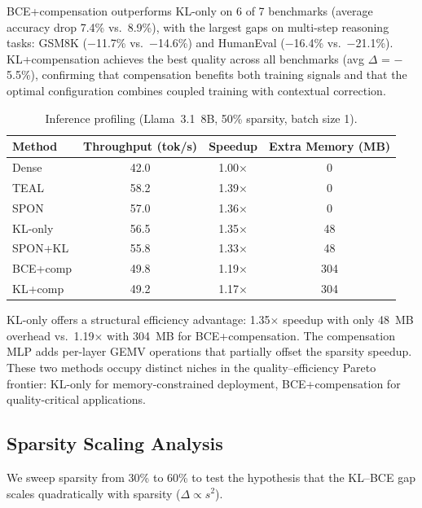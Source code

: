 \documentclass[11pt]{article}
\begin{document}
BCE+compensation outperforms KL-only on 6 of 7 benchmarks (average accuracy drop 7.4\% vs.\ 8.9\%), with the largest gaps on multi-step reasoning tasks: GSM8K ($-$11.7\% vs.\ $-$14.6\%) and HumanEval ($-$16.4\% vs.\ $-$21.1\%).
KL+compensation achieves the best quality across all benchmarks (avg $\Delta$ = $-$5.5\%), confirming that compensation benefits both training signals and that the optimal configuration combines coupled training with contextual correction.

\begin{table}[h]
\centering
\caption{Inference profiling (Llama~3.1~8B, 50\% sparsity, batch size 1).}
\label{tab:profiling}
\small
\begin{tabular}{lccc}
\toprule
Method & Throughput (tok/s) & Speedup & Extra Memory (MB) \\
\midrule
Dense & 42.0 & 1.00$\times$ & 0 \\
TEAL & 58.2 & 1.39$\times$ & 0 \\
SPON & 57.0 & 1.36$\times$ & 0 \\
KL-only & 56.5 & 1.35$\times$ & 48 \\
SPON+KL & 55.8 & 1.33$\times$ & 48 \\
BCE+comp & 49.8 & 1.19$\times$ & 304 \\
KL+comp & 49.2 & 1.17$\times$ & 304 \\
\bottomrule
\end{tabular}
\end{table}

KL-only offers a structural efficiency advantage: 1.35$\times$ speedup with only 48~MB overhead vs.\ 1.19$\times$ with 304~MB for BCE+compensation.
The compensation MLP adds per-layer GEMV operations that partially offset the sparsity speedup.
These two methods occupy distinct niches in the quality--efficiency Pareto frontier: KL-only for memory-constrained deployment, BCE+compensation for quality-critical applications.

\subsection{Sparsity Scaling Analysis}

We sweep sparsity from 30\% to 60\% to test the hypothesis that the KL--BCE gap scales quadratically with sparsity ($\Delta \propto s^2$).
\end{document}
